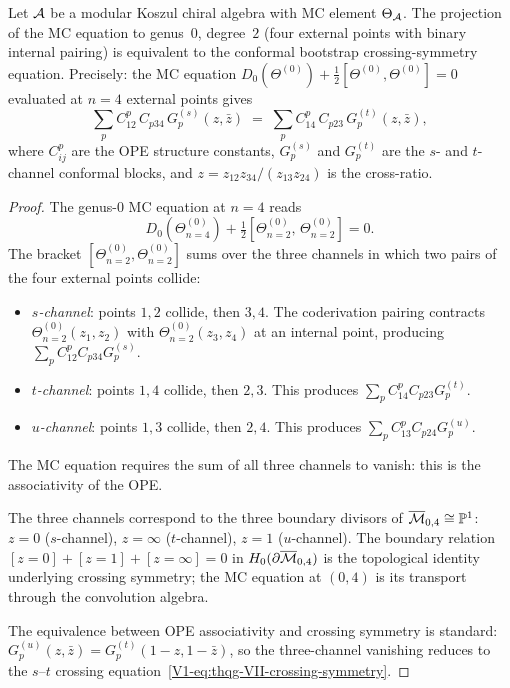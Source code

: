 \begin{theorem}
Let $\mathcal{A}$ be a modular Koszul chiral algebra with MC element
$\Theta_{\mathcal{A}}$. The projection of the MC equation to genus~$0$,
degree~$2$ \textup{(}four external points with binary internal
pairing\textup{)} is equivalent to the conformal bootstrap
crossing-symmetry equation. Precisely: the MC equation
$D_0(\Theta^{(0)}) + \frac{1}{2}[\Theta^{(0)},\Theta^{(0)}] = 0$
evaluated at $n = 4$ external points gives
\begin{equation}%
\sum_p C_{12}^p\, C_{p34}\, G_p^{(s)}(z, \bar{z})
\;=\;
\sum_p C_{14}^p\, C_{p23}\, G_p^{(t)}(z, \bar{z}),
\end{equation}
where $C_{ij}^p$ are the OPE structure constants,
$G_p^{(s)}$ and $G_p^{(t)}$ are the $s$- and $t$-channel
conformal blocks, and
$z = z_{12}z_{34}/(z_{13}z_{24})$ is the cross-ratio.
\end{theorem}

\begin{proof}
The genus-$0$ MC equation at $n = 4$ reads
\[
D_0(\Theta^{(0)}_{n=4})
+ \tfrac{1}{2}[\Theta^{(0)}_{n=2},\, \Theta^{(0)}_{n=2}]
= 0.
\]
The bracket $[\Theta^{(0)}_{n=2}, \Theta^{(0)}_{n=2}]$
sums over the three channels in which two pairs of the four
external points collide:
\begin{itemize}
\item \emph{$s$-channel}: points $1,2$ collide, then $3,4$.
 The coderivation pairing contracts
 $\Theta^{(0)}_{n=2}(z_1, z_2)$ with
 $\Theta^{(0)}_{n=2}(z_3, z_4)$ at an internal point,
 producing $\sum_p C_{12}^p C_{p34} G_p^{(s)}$.
\item \emph{$t$-channel}: points $1,4$ collide, then $2,3$.
 This produces $\sum_p C_{14}^p C_{p23} G_p^{(t)}$.
\item \emph{$u$-channel}: points $1,3$ collide, then $2,4$.
 This produces $\sum_p C_{13}^p C_{p24} G_p^{(u)}$.
\end{itemize}
The MC equation requires the sum of all three channels to
vanish: this is the associativity of the OPE.

The three channels correspond to the three boundary divisors of
$\overline{\mathcal{M}}_{0,4} \cong \mathbb{P}^1$:
$z = 0$ ($s$-channel), $z = \infty$ ($t$-channel),
$z = 1$ ($u$-channel). The boundary relation
$[z{=}0] + [z{=}1] + [z{=}\infty] = 0$ in
$H_0(\partial\overline{\mathcal{M}}_{0,4})$ is the topological identity
underlying crossing symmetry; the MC equation at $(0,4)$ is its
transport through the convolution algebra.

The equivalence between OPE associativity and crossing symmetry
is standard:
$G_p^{(u)}(z, \bar{z}) = G_p^{(t)}(1-z, 1-\bar{z})$, so
the three-channel vanishing reduces to the
$s$--$t$ crossing equation~\eqref{V1-eq:thqg-VII-crossing-symmetry}.
\end{proof}

